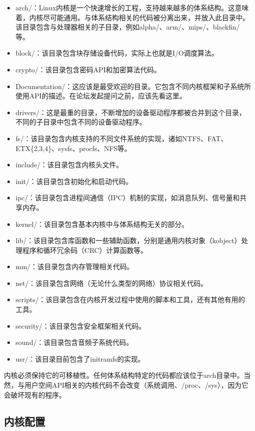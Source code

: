 \documentclass[lang=cn,newtx,10pt,scheme=chinese]{elegantbook}
\begin{document}
\begin{itemize}
    \item arch/：Linux内核是一个快速增长的工程，支持越来越多的体系结构。这意味着，内核尽可能通用。与体系结构相关的代码被分离出来，并放入此目录中。该目录包含与处理器相关的子目录，例如alpha/、arm/、mips/、blackfin/等。
    \item block/：该目录包含块存储设备代码，实际上也就是I/O调度算法。
    \item crypto/：该目录包含密码API和加密算法代码。
    \item Documentation/：这应该是最受欢迎的目录。它包含不同内核框架和子系统所使用API的描述。在论坛发起提问之前，应该先看这里。
    \item drivers/：这是最重的目录，不断增加的设备驱动程序都被合并到这个目录，不同的子目录中包含不同的设备驱动程序。
    \item fs/：该目录包含内核支持的不同文件系统的实现，诸如NTFS、FAT、ETX\{2,3,4\}、sysfs、procfs、NFS等。
    \item include/：该目录包含内核头文件。
    \item init/：该目录包含初始化和启动代码。
    \item ipc/：该目录包含进程间通信（IPC）机制的实现，如消息队列、信号量和共享内存。
    \item kernel/：该目录包含基本内核中与体系结构无关的部分。
    \item lib/：该目录包含库函数和一些辅助函数，分别是通用内核对象（kobject）处理程序和循环冗余码（CRC）计算函数等。
    \item mm/：该目录包含内存管理相关代码。
    \item net/：该目录包含网络（无论什么类型的网络）协议相关代码。
    \item scripts/：该目录包含在内核开发过程中使用的脚本和工具，还有其他有用的工具。
    \item security/：该目录包含安全框架相关代码。
    \item sound/：该目录包含音频子系统代码。
    \item usr/：该目录目前包含了initramfs的实现。
\end{itemize}

内核必须保持它的可移植性。任何体系结构特定的代码都应该位于arch目录中。当然，与用户空间API相关的内核代码不会改变（系统调用、/proc、/sys），因为它会破坏现有的程序。

\subsection{内核配置}
\end{document}
